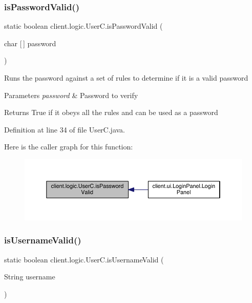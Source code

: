 \subsubsection{\texorpdfstring{is\+Password\+Valid()}{isPasswordValid()}}
{\footnotesize\ttfamily static boolean client.\+logic.\+User\+C.\+is\+Password\+Valid (\begin{DoxyParamCaption}\item[{char \mbox{[}$\,$\mbox{]}}]{password }\end{DoxyParamCaption})\hspace{0.3cm}{\ttfamily [static]}}

Runs the password against a set of rules to determine if it is a valid password


\begin{DoxyParams}{Parameters}
{\em password} & Password to verify \\
\hline
\end{DoxyParams}
\begin{DoxyReturn}{Returns}
True if it obeys all the rules and can be used as a password 
\end{DoxyReturn}


Definition at line 34 of file User\+C.\+java.

Here is the caller graph for this function\+:
\nopagebreak
\begin{figure}[H]
\begin{center}
\leavevmode
\includegraphics[width=350pt]{classclient_1_1logic_1_1_user_c_a724d1799c3963f516238cdf0d85ccf52_icgraph}
\end{center}
\end{figure}
\hypertarget{classclient_1_1logic_1_1_user_c_a62765c4c4912ee02b3ef70f1b9c0fb4e}{}\label{classclient_1_1logic_1_1_user_c_a62765c4c4912ee02b3ef70f1b9c0fb4e} 
\subsubsection{\texorpdfstring{is\+Username\+Valid()}{isUsernameValid()}}
{\footnotesize\ttfamily static boolean client.\+logic.\+User\+C.\+is\+Username\+Valid (\begin{DoxyParamCaption}\item[{String}]{username }\end{DoxyParamCaption})\hspace{0.3cm}{\ttfamily [static]}}

